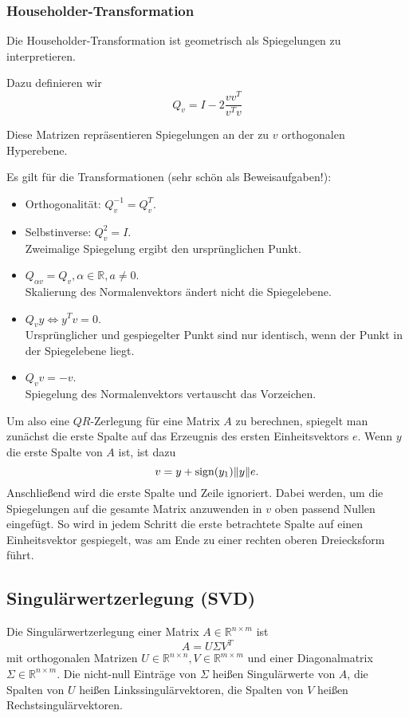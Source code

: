 \documentclass[a4paper,parskip=half*,DIV=7,fontsize=11pt]{scrartcl}
\DeclarePairedDelimiter\norm{\lVert}{\rVert}
\DeclareMathOperator\sign{sign}
\begin{document}
\subsubsection{Householder-Transformation}

Die Householder-Transformation ist geometrisch als Spiegelungen zu interpretieren.

Dazu definieren wir
\[ Q_v = I - 2 \frac{v v^T}{v^T v} \]

Diese Matrizen repräsentieren Spiegelungen an der zu $v$ orthogonalen Hyperebene.

Es gilt für die Transformationen (sehr schön als Beweisaufgaben!):

\begin{itemize}
  \item Orthogonalität: $Q_v^{-1} = Q_v^T$.
  \item Selbstinverse: $Q_v^2 = I$.\\Zweimalige Spiegelung ergibt den ursprünglichen Punkt.
  \item $Q_{\alpha v} = Q_v, \alpha \in \mathbb{R}, a \neq 0$.\\Skalierung des Normalenvektors ändert nicht die Spiegelebene.
  \item $Q_v y \Leftrightarrow y^T v = 0$.\\
        Ursprünglicher und gespiegelter Punkt sind nur identisch, wenn der Punkt in der Spiegelebene liegt.
  \item $Q_v v = -v$.\\
        Spiegelung des Normalenvektors vertauscht das Vorzeichen.   
\end{itemize}

Um also eine $QR$-Zerlegung für eine Matrix $A$ zu berechnen, spiegelt man zunächst die erste Spalte auf das Erzeugnis des ersten Einheitsvektors $e$. Wenn $y$ die erste Spalte von $A$ ist, ist dazu 
\[v = y + \sign(y_1) \norm{y}e.\]
Anschließend wird die erste Spalte und Zeile ignoriert. Dabei werden, um die Spiegelungen auf die gesamte Matrix anzuwenden in $v$ oben passend Nullen eingefügt. So wird in jedem Schritt die erste betrachtete Spalte auf einen Einheitsvektor gespiegelt, was am Ende zu einer rechten oberen Dreiecksform führt.

\subsection{Singulärwertzerlegung (SVD)}

Die Singulärwertzerlegung einer Matrix $A \in \mathbb{R}^{n \times m}$ ist
\[A = U\Sigma V^T\]
mit orthogonalen Matrizen $U \in \mathbb{R}^{n \times n}, V \in \mathbb{R}^{m \times m}$ und einer Diagonalmatrix $\Sigma \in \mathbb{R}^{n \times m}$. Die nicht-null Einträge von $\Sigma$ heißen Singulärwerte von $A$, die Spalten von $U$ heißen Linkssingulärvektoren, die Spalten von $V$ heißen Rechstsingulärvektoren.
\end{document}
